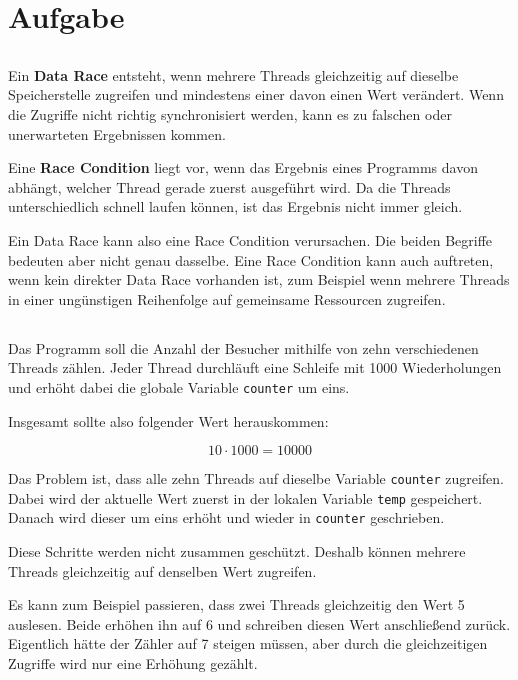 \documentclass[a4paper,11pt]{article}
\begin{document}
	
	\section{Aufgabe}
	
	\subsection{}
	
	Ein \textbf{Data Race} entsteht, wenn mehrere Threads gleichzeitig auf dieselbe Speicherstelle zugreifen und mindestens einer davon einen Wert verändert. Wenn die Zugriffe nicht richtig synchronisiert werden, kann es zu falschen oder unerwarteten Ergebnissen kommen.
	
	Eine \textbf{Race Condition} liegt vor, wenn das Ergebnis eines Programms davon abhängt, welcher Thread gerade zuerst ausgeführt wird. Da die Threads unterschiedlich schnell laufen können, ist das Ergebnis nicht immer gleich.
	
	Ein Data Race kann also eine Race Condition verursachen. Die beiden Begriffe bedeuten aber nicht genau dasselbe. Eine Race Condition kann auch auftreten, wenn kein direkter Data Race vorhanden ist, zum Beispiel wenn mehrere Threads in einer ungünstigen Reihenfolge auf gemeinsame Ressourcen zugreifen.
	
	\subsection{}
	
	Das Programm soll die Anzahl der Besucher mithilfe von zehn verschiedenen Threads zählen. Jeder Thread durchläuft eine Schleife mit 1000 Wiederholungen und erhöht dabei die globale Variable \texttt{counter} um eins.
	
	Insgesamt sollte also folgender Wert herauskommen:
	
	\[
	10 \cdot 1000 = 10000
	\]
	
	Das Problem ist, dass alle zehn Threads auf dieselbe Variable \texttt{counter} zugreifen. Dabei wird der aktuelle Wert zuerst in der lokalen Variable \texttt{temp} gespeichert. Danach wird dieser um eins erhöht und wieder in \texttt{counter} geschrieben.
	
	Diese Schritte werden nicht zusammen geschützt. Deshalb können mehrere Threads gleichzeitig auf denselben Wert zugreifen.
	
	Es kann zum Beispiel passieren, dass zwei Threads gleichzeitig den Wert 5 auslesen. Beide erhöhen ihn auf 6 und schreiben diesen Wert anschließend zurück. Eigentlich hätte der Zähler auf 7 steigen müssen, aber durch die gleichzeitigen Zugriffe wird nur eine Erhöhung gezählt.
	
\end{document}
